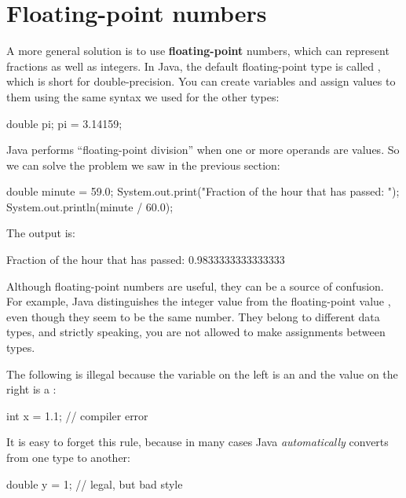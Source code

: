 \section{Floating-point numbers}


A more general solution is to use {\bf floating-point} numbers, which can represent fractions as well as integers.
In Java, the default floating-point type is called , which is short for double-precision.
You can create  variables and assign values to them using the same syntax we used for the other types:

\begin{code}
double pi;
pi = 3.14159;
\end{code}

Java performs ``floating-point division'' when one or more operands are  values.
So we can solve the problem we saw in the previous section:

\begin{code}
double minute = 59.0;
System.out.print("Fraction of the hour that has passed: ");
System.out.println(minute / 60.0);
\end{code}

The output is:

\begin{stdout}
Fraction of the hour that has passed: 0.9833333333333333
\end{stdout}

Although floating-point numbers are useful, they can be a source of confusion.
For example, Java distinguishes the integer value  from the floating-point value , even though they seem to be the same number.
They belong to different data types, and strictly speaking, you are not allowed to make assignments between types.

The following is illegal because the variable on the left is an  and the value on the right is a :

\begin{code}
int x = 1.1;  // compiler error
\end{code}

It is easy to forget this rule, because in many cases Java {\em automatically} converts from one type to another:

\begin{code}
double y = 1;  // legal, but bad style
\end{code}

